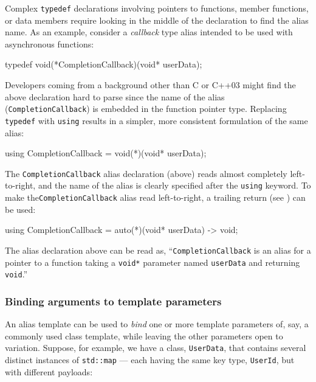 Complex \lstinline!typedef! declarations involving pointers to functions,
member functions, or data members require looking in the middle of the
declaration to find the alias name. As an example, consider a
\emph{callback} type alias intended to be used with asynchronous functions:

\begin{emcppslisting}
typedef void(*CompletionCallback)(void* userData);
\end{emcppslisting}

\noindent Developers coming from a background other than C or C++03 might find the
above declaration hard to parse since the name of the alias
(\lstinline!CompletionCallback!) is embedded in the function pointer type.
Replacing \lstinline!typedef! with \lstinline!using! results in a simpler,
more consistent formulation of the same alias:

\begin{emcppslisting}
using CompletionCallback = void(*)(void* userData);
\end{emcppslisting}

\noindent The \lstinline!CompletionCallback! alias declaration (above) reads almost
completely left-to-right, and the name of the alias is clearly
specified after the \lstinline!using! keyword. To make the\linebreak[4]
\lstinline!CompletionCallback! alias read left-to-right, a
  trailing return (see )
can be used:

  \begin{emcppslisting}
  using CompletionCallback = auto(*)(void* userData) -> void;
  \end{emcppslisting}

\noindent The alias declaration above can be read as,
  ``\lstinline!CompletionCallback! is an alias for a pointer to a
  function taking a \lstinline!void*! parameter named \lstinline!userData! and
  returning \lstinline!void!.''

\subsubsection[Binding arguments to template parameters]{Binding arguments to template parameters}\label{binding-template-arguments}

An alias template can be used to \emph{bind} one or more template
parameters of, say, a commonly used class template, while leaving the
other parameters open to variation. Suppose, for example, we have a class, \lstinline!UserData!, that contains
several distinct instances of \lstinline!std::map! --- each
having the same key type, \lstinline!UserId!, but with different payloads:

